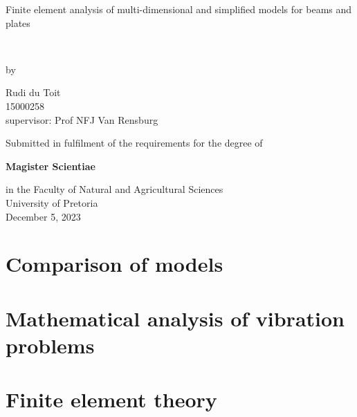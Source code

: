 \documentclass[12pt]{report}
\begin{document}
\begin{titlepage}
  \centering
  \vspace*{0.3in}
  {\Huge Finite element analysis of multi-dimensional and simplified models for beams and plates\par}
  \vspace{0.5in}\
  {\Large by\par}
  {\Large Rudi du Toit\\[0.1in]}
  {\Large 15000258 \\[0.1in]}
  {supervisor: Prof NFJ Van Rensburg \\[0.75in]}

  {Submitted in fulfilment of the requirements for the degree of\\[0.1in]}
  
  {\bfseries Magister Scientiae\\[0.1in]}
  
  {in the Faculty of Natural and Agricultural Sciences\\[0.1in]}
  {University of Pretoria\\[0.75in]}
  December 5, 2023
\end{titlepage}





\tableofcontents

\chapter{Comparison of models}\label{ch:comparison-of-models}





%

\chapter{Mathematical analysis of vibration problems}\label{ch:mathematical-analysis-of-vibration-problems}


\chapter{Finite element theory}\label{ch:finite-element-theory}


\end{document}
